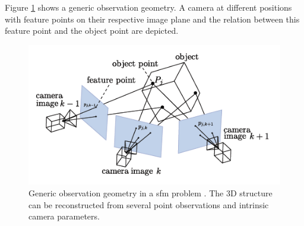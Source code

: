 Figure \ref{fig:sfm_geometry} shows a generic observation geometry. A camera at different positions with feature points on their respective image plane and the relation between this feature point and the object point are depicted. 

\begin{figure}[htb]
    \centering
    \includegraphics[width=\textwidth]{doc/thesis/0_figures/sfm/sfm_geometry.png}
    \caption{Generic observation geometry in a \gls{sfm} problem \cite{andrews2019asteroid}. The 3D structure can be reconstructed from several point observations and intrinsic camera parameters.}
    \label{fig:sfm_geometry}
\end{figure}

